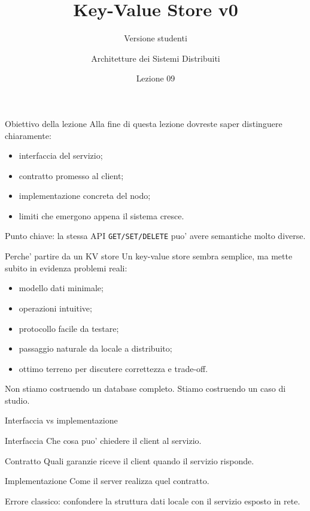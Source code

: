 \documentclass[aspectratio=169]{beamer}
\title{Key-Value Store v0}
\subtitle{Versione studenti}
\author{Architetture dei Sistemi Distribuiti}
\date{Lezione 09}
\begin{document}
\begin{frame}
  \titlepage
\end{frame}

\begin{frame}{Obiettivo della lezione}
  Alla fine di questa lezione dovreste saper distinguere chiaramente:

  \begin{itemize}
    \item interfaccia del servizio;
    \item contratto promesso al client;
    \item implementazione concreta del nodo;
    \item limiti che emergono appena il sistema cresce.
  \end{itemize}

  \vspace{0.5em}
  Punto chiave: la stessa API \texttt{GET/SET/DELETE} puo' avere semantiche molto diverse.
\end{frame}

\begin{frame}{Perche' partire da un KV store}
  Un key-value store sembra semplice, ma mette subito in evidenza problemi reali:

  \begin{itemize}
    \item modello dati minimale;
    \item operazioni intuitive;
    \item protocollo facile da testare;
    \item passaggio naturale da locale a distribuito;
    \item ottimo terreno per discutere correttezza e trade-off.
  \end{itemize}

  \vspace{0.5em}
  Non stiamo costruendo un database completo. Stiamo costruendo un caso di studio.
\end{frame}

\begin{frame}{Interfaccia vs implementazione}
  \begin{block}{Interfaccia}
    Che cosa puo' chiedere il client al servizio.
  \end{block}

  \begin{block}{Contratto}
    Quali garanzie riceve il client quando il servizio risponde.
  \end{block}

  \begin{block}{Implementazione}
    Come il server realizza quel contratto.
  \end{block}

  \vspace{0.5em}
  Errore classico: confondere la struttura dati locale con il servizio esposto in rete.
\end{frame}
\end{document}

